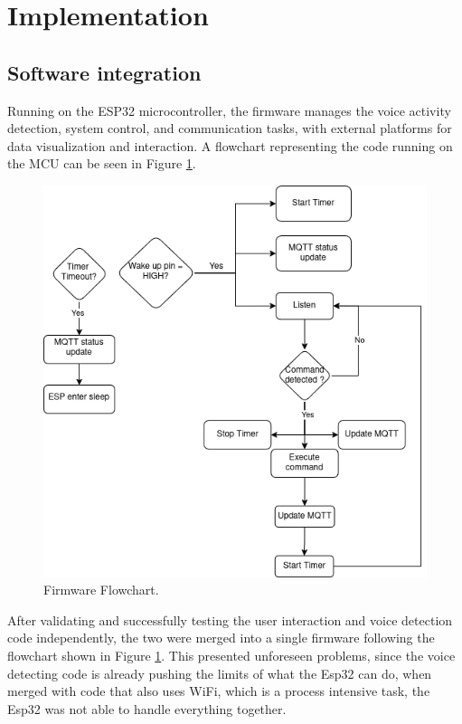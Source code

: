 \section{Implementation}

\subsection{Software integration}
\label{sec:SoftwareInt}
Running on the ESP32 microcontroller, the firmware manages the voice activity detection, system control, and communication tasks, with external platforms for data visualization and interaction. A flowchart representing the code running on the MCU can be seen in Figure \ref{fig:firmwareFlowchart}. 

\begin{figure}[H]
    \centering
    \includegraphics*[scale = 0.5]{Images/FirmawareFlowChart.png}
    \caption{Firmware Flowchart.}
    \label{fig:firmwareFlowchart}
\end{figure}

After validating and successfully testing the user interaction and voice detection code independently, the two were merged into a single firmware following the flowchart shown in Figure \ref{fig:firmwareFlowchart}. This presented unforeseen problems, since the voice detecting code is already pushing the limits of what the Esp32 can do, when merged with code that also uses WiFi, which is a process intensive task, the Esp32 was not able to handle everything together.

